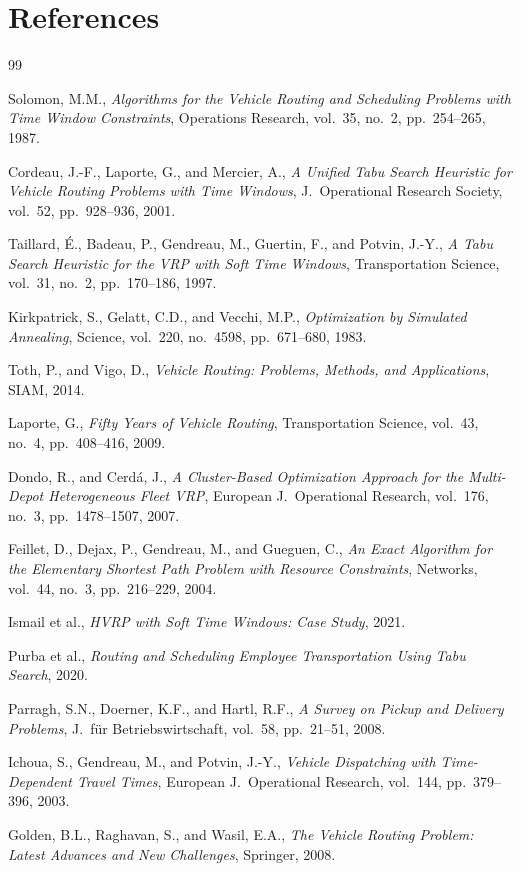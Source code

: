 \documentclass[11pt,a4paper]{article}
\begin{document}

\section*{References}

\begin{thebibliography}{99}

Solomon, M.M.,
\textit{Algorithms for the Vehicle Routing and Scheduling Problems with Time Window Constraints},
Operations Research, vol.~35, no.~2, pp.~254--265, 1987.

Cordeau, J.-F., Laporte, G., and Mercier, A.,
\textit{A Unified Tabu Search Heuristic for Vehicle Routing Problems with Time Windows},
J.\ Operational Research Society, vol.~52, pp.~928--936, 2001.

Taillard, \'E., Badeau, P., Gendreau, M., Guertin, F., and Potvin, J.-Y.,
\textit{A Tabu Search Heuristic for the VRP with Soft Time Windows},
Transportation Science, vol.~31, no.~2, pp.~170--186, 1997.

Kirkpatrick, S., Gelatt, C.D., and Vecchi, M.P.,
\textit{Optimization by Simulated Annealing},
Science, vol.~220, no.~4598, pp.~671--680, 1983.

Toth, P., and Vigo, D.,
\textit{Vehicle Routing: Problems, Methods, and Applications},
SIAM, 2014.

Laporte, G.,
\textit{Fifty Years of Vehicle Routing},
Transportation Science, vol.~43, no.~4, pp.~408--416, 2009.

Dondo, R., and Cerd\'a, J.,
\textit{A Cluster-Based Optimization Approach for the Multi-Depot Heterogeneous Fleet VRP},
European J.\ Operational Research, vol.~176, no.~3, pp.~1478--1507, 2007.

Feillet, D., Dejax, P., Gendreau, M., and Gueguen, C.,
\textit{An Exact Algorithm for the Elementary Shortest Path Problem with Resource Constraints},
Networks, vol.~44, no.~3, pp.~216--229, 2004.

Ismail et al.,
\textit{HVRP with Soft Time Windows: Case Study}, 2021.

Purba et al.,
\textit{Routing and Scheduling Employee Transportation Using Tabu Search}, 2020.

Parragh, S.N., Doerner, K.F., and Hartl, R.F.,
\textit{A Survey on Pickup and Delivery Problems},
J.\ f\"ur Betriebswirtschaft, vol.~58, pp.~21--51, 2008.

Ichoua, S., Gendreau, M., and Potvin, J.-Y.,
\textit{Vehicle Dispatching with Time-Dependent Travel Times},
European J.\ Operational Research, vol.~144, pp.~379--396, 2003.

Golden, B.L., Raghavan, S., and Wasil, E.A.,
\textit{The Vehicle Routing Problem: Latest Advances and New Challenges},
Springer, 2008.

\end{thebibliography}
\end{document}
